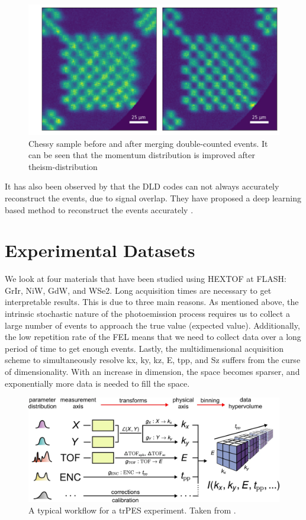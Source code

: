 \begin{figure}[h]
    \centering
    \includegraphics[width=0.7\linewidth]{images/chessy_deblurring_merged_events.png}
    \caption{Chessy sample before and after merging double-counted events. It can be seen that the momentum distribution is improved after theism-distribution}
    \label{fig:momentum-distribution}
\end{figure}


It has also been observed by \citeauthor{knipferDeepLearningbasedSpatiotemporal2024} that the \gls{DLD} codes can not always accurately reconstruct the events, due to signal overlap. They have proposed a deep learning based method to reconstruct the events accurately \cite{knipferDeepLearningbasedSpatiotemporal2024}.

\section{Experimental Datasets}\label{section:datasets}
We look at four materials that have been studied using \gls{HEXTOF} at \gls{FLASH}: \gls{GrIr}, \gls{NiW}, \gls{GdW}, and \gls{WSe2}. Long acquisition times are necessary to get interpretable results. This is due to three main reasons. As mentioned above, the intrinsic stochastic nature of the photoemission process requires us to collect a large number of events to approach the true value (expected value). Additionally, the low repetition rate of the \gls{FEL} means that we need to collect data over a long period of time to get enough events. Lastly, the multidimensional acquisition scheme to simultaneously resolve \gls{kx}, \gls{ky}, \gls{kz}, \gls{E}, \gls{tpp}, and \gls{Sz} suffers from the curse of dimensionality. With an increase in dimension, the space becomes sparser, and exponentially more data is needed to fill the space.

\begin{figure}[h]
    \centering
    \includegraphics[width=1\linewidth]{images/41597_2020_769_Fig2_HTML.png}
    \caption{A typical workflow for a \gls{trPES} experiment. Taken from \cite{xianOpensourceEndtoendWorkflow2020}.}
    \label{fig:mpes_workflow}
\end{figure}

